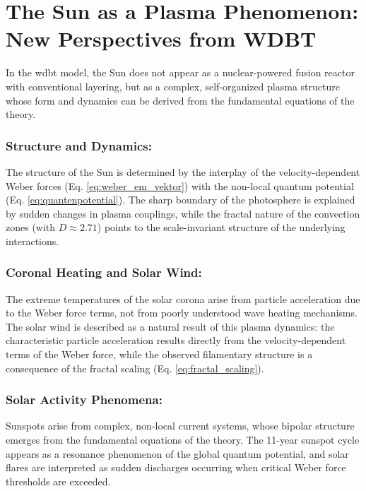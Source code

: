 \section{The Sun as a Plasma Phenomenon: New Perspectives from WDBT}
In the \gls{wdbt} model, the Sun does not appear as a nuclear-powered fusion reactor with conventional layering, but as a complex, self-organized plasma structure whose form and dynamics can be derived from the fundamental equations of the theory.

\subsubsection{Structure and Dynamics:}
The structure of the Sun is determined by the interplay of the velocity-dependent Weber forces (Eq. \ref{eq:weber_em_vektor}) with the non-local quantum potential (Eq. \ref{eq:quantenpotential}). The sharp boundary of the photosphere is explained by sudden changes in plasma couplings, while the fractal nature of the convection zones (with $D \approx 2.71$) points to the scale-invariant structure of the underlying interactions.

\subsubsection{Coronal Heating and Solar Wind:}
The extreme temperatures of the solar corona arise from particle acceleration due to the Weber force terms, not from poorly understood wave heating mechanisms. The solar wind is described as a natural result of this plasma dynamics: the characteristic particle acceleration results directly from the velocity-dependent terms of the Weber force, while the observed filamentary structure is a consequence of the fractal scaling (Eq. \ref{eq:fractal_scaling}).

\subsubsection{Solar Activity Phenomena:}
Sunspots arise from complex, non-local current systems, whose bipolar structure emerges from the fundamental equations of the theory. The 11-year sunspot cycle appears as a resonance phenomenon of the global quantum potential, and solar flares are interpreted as sudden discharges occurring when critical Weber force thresholds are exceeded.

